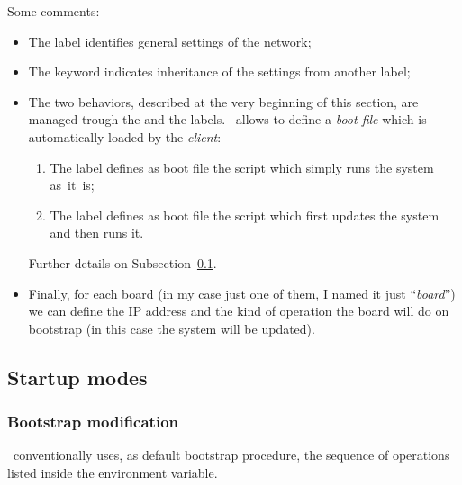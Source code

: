         Some comments:
        \begin{itemize}

        \item   The  label identifies general settings of
                the network;

        \item   The  keyword indicates inheritance of the
                settings from another label;

        \item   The two behaviors, described at the very beginning of this
                section, are managed trough the  and the
                 labels. \BootP\ allows to define a
                \emph{boot file} which is automatically loaded by the
                \emph{client}:
            \begin{enumerate}
            \item   The  label defines as boot file the
                    script which simply runs the system as~it~is;
            \item   The  label defines as boot file the
                    script which first updates the system and then runs
                    it.
            \end{enumerate}
                Further details on Subsection~\ref{sub:StartupModes}.

        \item   Finally, for each board (in my case just one of
                them, I named it just ``\emph{board}'') we can define the
                IP address and the kind of operation the board will do on
                bootstrap (in this case the system will be updated).

        \end{itemize}

\subsection{ Startup modes } \label{sub:StartupModes}

    \subsubsection{Bootstrap modification}

        \uBoot\ conventionally uses, as default bootstrap procedure, the
        sequence of operations listed inside the 
        environment variable.

